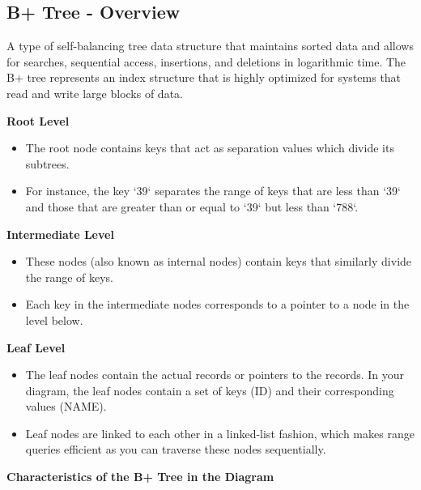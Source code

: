 \vspace{-0.3cm}
\subsection*{B+ Tree - Overview}
\vspace{-0.1cm}

\noindent
A type of self-balancing tree data structure that maintains sorted data and allows for searches,
sequential access, insertions, and deletions in logarithmic time.
The B+ tree represents an index structure that is highly optimized for systems that read and write large blocks of data.

\noindent
\textbf{Root Level}
\begin{itemize}[noitemsep,leftmargin=*]
\item{The root node contains keys that act as separation values which divide its subtrees.}
\item{For instance, the key `39` separates the range of keys that are less than `39` and those that are greater than or equal to `39` but less than `788`.}
\end{itemize}

\noindent
\textbf{Intermediate Level}
\begin{itemize}[noitemsep,leftmargin=*]
\item{These nodes (also known as internal nodes) contain keys that similarly divide the range of keys.}
\item{Each key in the intermediate nodes corresponds to a pointer to a node in the level below.}
\end{itemize}

\noindent
\textbf{Leaf Level}
\begin{itemize}[noitemsep,leftmargin=*]
\item{The leaf nodes contain the actual records or pointers to the records. In your diagram, the leaf nodes contain a set of keys (ID) and their corresponding values (NAME).}
\item{Leaf nodes are linked to each other in a linked-list fashion, which makes range queries efficient as you can traverse these nodes sequentially.}
\end{itemize}



\noindent
\textbf{Characteristics of the B+ Tree in the Diagram}

